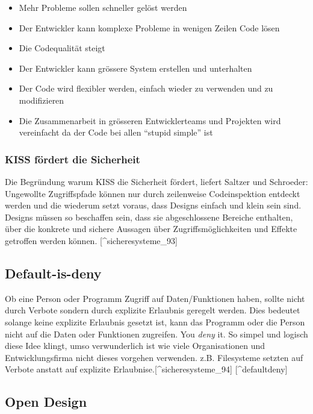 \begin{itemize}
\tightlist
\item
  Mehr Probleme sollen schneller gelöst werden
\item
  Der Entwickler kann komplexe Probleme in wenigen Zeilen Code lösen
\item
  Die Codequalität steigt
\item
  Der Entwickler kann grössere System erstellen und unterhalten
\item
  Der Code wird flexibler werden, einfach wieder zu verwenden und zu
  modifizieren
\item
  Die Zusammenarbeit in grösseren Entwicklerteams und Projekten wird
  vereinfacht da der Code bei allen ``stupid simple'' ist
\end{itemize}

\subsubsection{KISS fördert die
Sicherheit}\label{kiss-fuxf6rdert-die-sicherheit}

Die Begründung warum KISS die Sicherheit fördert, liefert Saltzer und
Schroeder: Ungewollte Zugriffspfade können nur durch zeilenweise
Codeinspektion entdeckt werden und die wiederum setzt voraus, dass
Designs einfach und klein sein sind. Designs müssen so beschaffen sein,
dass sie abgeschlossene Bereiche enthalten, über die konkrete und
sichere Aussagen über Zugriffsmöglichkeiten und Effekte getroffen werden
können. {[}\^{}sicheresysteme\_93{]}

\subsection{Default-is-deny}\label{default-is-deny}

Ob eine Person oder Programm Zugriff auf Daten/Funktionen haben, sollte
nicht durch Verbote sondern durch explizite Erlaubnis geregelt werden.
Dies bedeutet solange keine explizite Erlaubnis gesetzt ist, kann das
Programm oder die Person nicht auf die Daten oder Funktionen zugreifen.
You \emph{deny} it. So simpel und logisch diese Idee klingt, umso
verwunderlich ist wie viele Organisationen und Entwicklungsfirma nicht
dieses vorgehen verwenden. z.B. Filesysteme setzten auf Verbote anstatt
auf explizite Erlaubnise.{[}\^{}sicheresysteme\_94{]}
{[}\^{}defaultdeny{]}

\hypertarget{open-design}{\subsection{Open Design}\label{open-design}}

